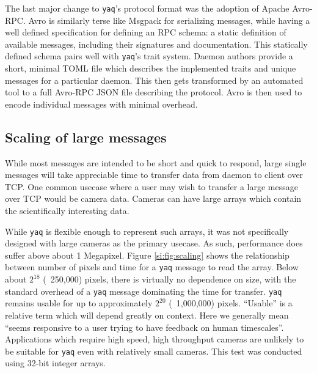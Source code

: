 \documentclass[11pt, full]{article}
\newcommand\yaq{\texttt{yaq}}
\begin{document}
The last major change to \yaq{}'s protocol format was the adoption of Apache Avro-RPC\cite{AvroSpecification}.
Avro is similarly terse like Msgpack for serializing messages, while having a well defined specification for defining an RPC schema: a static definition of available messages, including their signatures and documentation.
This statically defined schema pairs well with \yaq{}'s trait system.
Daemon authors provide a short, minimal TOML file which describes the implemented traits and unique messages for a particular daemon.
This then gets transformed by an automated tool to a full Avro-RPC JSON file describing the protocol.
Avro is then used to encode individual messages with minimal overhead.


\subsection{Scaling of large messages}

While most messages are intended to be short and quick to respond, large single messages will take appreciable time to transfer data from daemon to client over TCP.
One common usecase where a user may wish to transfer a large message over TCP would be camera data.
Cameras can have large arrays which contain the scientifically interesting data.

While \yaq{} is flexible enough to represent such arrays, it was not specifically designed with large cameras as the primary usecase.
As such, performance does suffer above about 1 Megapixel.
Figure \ref{si:fig:scaling} shows the relationship between number of pixels and time for a \yaq{} message to read the array.
Below about $2^{18}$ (~250,000) pixels, there is virtually no dependence on size, with the standard overhead of a \yaq{} message dominating the time for transfer.
\yaq{} remains usable for up to approximately $2^{20}$ (~1,000,000) pixels.
``Usable'' is a relative term which will depend greatly on context.
Here we generally mean ``seems responsive to a user trying to have feedback on human timescales''.
Applications which require high speed, high throughput cameras are unlikely to be suitable for \yaq{} even with relatively small cameras.
This test was conducted using 32-bit integer arrays.
\end{document}
